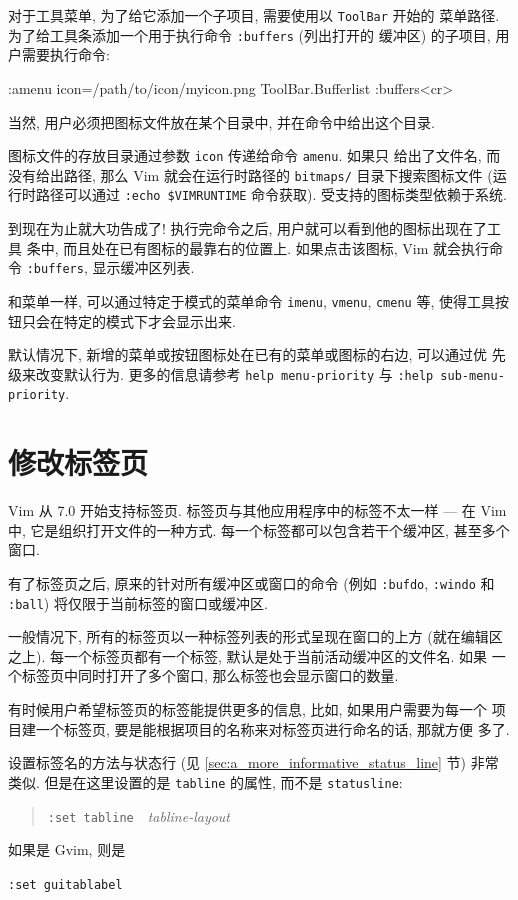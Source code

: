 对于工具菜单, 为了给它添加一个子项目, 需要使用以 \texttt{ToolBar} 开始的
菜单路径. 为了给工具条添加一个用于执行命令 \texttt{:buffers} (列出打开的
缓冲区) 的子项目, 用户需要执行命令:
\begin{vimcmd}
:amenu icon=/path/to/icon/myicon.png ToolBar.Bufferlist :buffers<cr>
\end{vimcmd}
当然, 用户必须把图标文件放在某个目录中, 并在命令中给出这个目录.

图标文件的存放目录通过参数 \texttt{icon} 传递给命令 \texttt{amenu}. 如果只
给出了文件名, 而没有给出路径, 那么 Vim 就会在运行时路径的 \texttt{bitmaps/}
目录下搜索图标文件 (运行时路径可以通过 \texttt{:echo \$VIMRUNTIME}
命令获取). 受支持的图标类型依赖于系统.

到现在为止就大功告成了! 执行完命令之后, 用户就可以看到他的图标出现在了工具
条中, 而且处在已有图标的最靠右的位置上. 如果点击该图标, Vim 就会执行命令
\texttt{:buffers}, 显示缓冲区列表.

和菜单一样, 可以通过特定于模式的菜单命令 \texttt{imenu}, \texttt{vmenu},
\texttt{cmenu} 等, 使得工具按钮只会在特定的模式下才会显示出来.

\begin{warning}
默认情况下, 新增的菜单或按钮图标处在已有的菜单或图标的右边, 可以通过优
先级来改变默认行为. 更多的信息请参考 \texttt{help menu-priority} 与 
\texttt{:help sub-menu-priority}.
\end{warning}

\section{修改标签页}
\label{sec:modifying_tabs}
Vim 从 7.0 开始支持标签页. 标签页与其他应用程序中的标签不太一样 --- 在
Vim 中, 它是组织打开文件的一种方式. 每一个标签都可以包含若干个缓冲区,
甚至多个窗口.

有了标签页之后, 原来的针对所有缓冲区或窗口的命令 (例如 \texttt{:bufdo},
\texttt{:windo} 和 \texttt{:ball}) 将仅限于当前标签的窗口或缓冲区.

一般情况下, 所有的标签页以一种标签列表的形式呈现在窗口的上方 (就在编辑区
之上). 每一个标签页都有一个标签, 默认是处于当前活动缓冲区的文件名. 如果 
一个标签页中同时打开了多个窗口, 那么标签也会显示窗口的数量.
\begin{center}
\end{center}
有时候用户希望标签页的标签能提供更多的信息, 比如, 如果用户需要为每一个
项目建一个标签页, 要是能根据项目的名称来对标签页进行命名的话, 那就方便
多了.
\begin{center}
\end{center}
设置标签名的方法与状态行 (见 \ref{sec:a_more_informative_status_line} 节)
非常类似. 但是在这里设置的是 \texttt{tabline} 的属性, 而不是
\texttt{statusline}:
\begin{quotation}
    \texttt{:set tabline}\ \ \textit{tabline-layout}
\end{quotation}
\begin{center}
\end{center}
如果是 Gvim, 则是
\begin{vimcmd}
\texttt{:set guitablabel}
\end{vimcmd}

